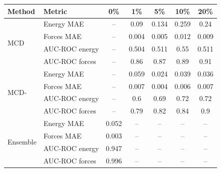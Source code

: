 \begin{tabular}{llccccc}
\toprule
{Method} &  {Metric} & 0\% & 1\% & 5\% & 10\% & 20\%  \\
\midrule
\multirow{4}{*}{MCD} & Energy MAE & -- & 0.09 & 0.134 & 0.259 & 0.24  \\
& Forces MAE & -- & 0.004 & 0.005 & 0.012 & 0.009  \\
& AUC-ROC energy & -- &  0.504 & 0.511 & 0.55 & 0.511 \\
& AUC-ROC forces & -- &  0.86 & 0.87 & 0.89 & 0.91  \\
\midrule
\multirow{4}{*}{MCD-\oursacro{}} & Energy MAE & -- & 0.059 & 0.024 & 0.039 & 0.036\\
& Forces MAE & -- & 0.007 & 0.004 & 0.006 & 0.007\\
& AUC-ROC energy & -- & 0.6 & 0.69 & 0.72 & 0.72\\
& AUC-ROC forces & -- & 0.79 & 0.82 & 0.84 & 0.9\\
\midrule
\multirow{4}{*}{Ensemble} & Energy MAE & 0.052 & -- & -- & -- & -- \\
& Forces MAE & 0.003  & -- & -- & -- & --\\
& AUC-ROC energy & 0.947 & -- & -- & -- & --\\
& AUC-ROC forces & 0.996 & -- & -- & -- & -- \\
\bottomrule
\end{tabular}